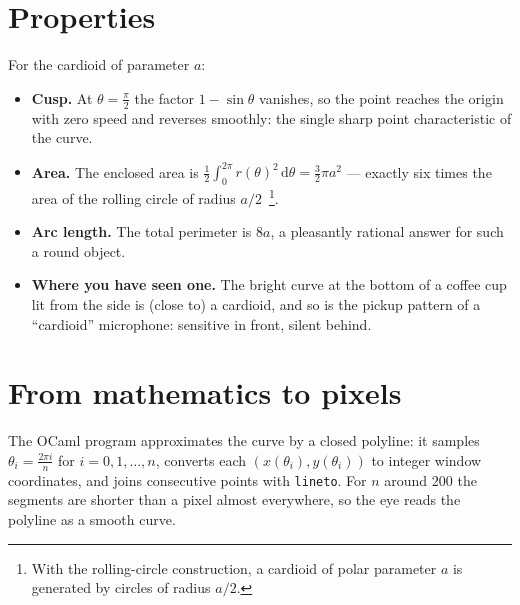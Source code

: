 \documentclass[11pt]{article}
\begin{document}
\section{Properties}

For the cardioid of parameter $a$:
\begin{itemize}
  \item \textbf{Cusp.} At $\theta = \frac{\pi}{2}$ the factor $1 - \sin\theta$
    vanishes, so the point reaches the origin with zero speed and reverses
    smoothly: the single sharp point characteristic of the curve.
  \item \textbf{Area.} The enclosed area is
    $\displaystyle \frac{1}{2}\int_0^{2\pi} r(\theta)^2 \,\mathrm{d}\theta
      = \frac{3}{2}\pi a^2$
    --- exactly six times the area of the rolling circle of radius $a/2$\,%
    \footnote{With the rolling-circle construction, a cardioid of polar
    parameter $a$ is generated by circles of radius $a/2$.}.
  \item \textbf{Arc length.} The total perimeter is $8a$, a pleasantly
    rational answer for such a round object.
  \item \textbf{Where you have seen one.} The bright curve at the bottom of a
    coffee cup lit from the side is (close to) a cardioid, and so is the pickup
    pattern of a ``cardioid'' microphone: sensitive in front, silent behind.
\end{itemize}

\section{From mathematics to pixels}

The OCaml program approximates the curve by a closed polyline: it samples
$\theta_i = \frac{2\pi i}{n}$ for $i = 0, 1, \ldots, n$, converts each
$(x(\theta_i), y(\theta_i))$ to integer window coordinates, and joins
consecutive points with \texttt{lineto}. For $n$ around $200$ the segments are
shorter than a pixel almost everywhere, so the eye reads the polyline as a
smooth curve.
\end{document}
